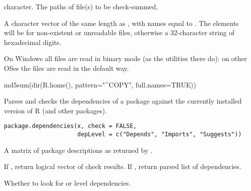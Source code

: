%
\begin{Arguments}
\begin{ldescription}
\item[\code{files}] character. The paths of file(s) to be check-summed.
\end{ldescription}
\end{Arguments}
%
\begin{Value}
A character vector of the same length as , with names
equal to . The elements
will be  for non-existent or unreadable files, otherwise
a 32-character string of hexadecimal digits.

On Windows all files are read in binary mode (as the 
utilities there do): on other OSes the files are read in the default way.
\end{Value}
%
\begin{SeeAlso}\relax
{}
\end{SeeAlso}
%
\begin{Examples}
\begin{ExampleCode}
md5sum(dir(R.home(), pattern="^COPY", full.names=TRUE))
\end{ExampleCode}
\end{Examples}
%
\begin{Description}\relax
Parses and checks the dependencies of a package against the currently
installed version of R (and other packages). 
\end{Description}
%
\begin{Usage}
\begin{verbatim}
package.dependencies(x, check = FALSE,
                     depLevel = c("Depends", "Imports", "Suggests"))
\end{verbatim}
\end{Usage}
%
\begin{Arguments}
\begin{ldescription}
\item[\code{x}] A matrix of package descriptions as returned by
.
\item[\code{check}] If , return logical vector of check results.
If , return parsed list of dependencies.
\item[\code{depLevel}] Whether to look for  or 
level dependencies.
\end{ldescription}
\end{Arguments}
